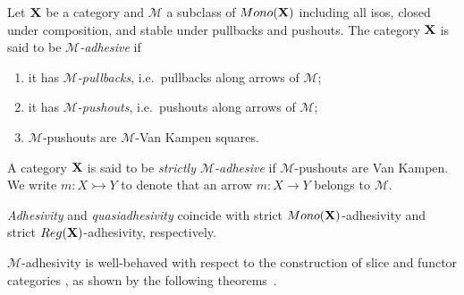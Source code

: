 \documentclass[a4paper,UKenglish,cleveref,pdftex,thm-restate,numberwithinsect]{lipics-v2021}
\def\X{\textbf {\textup{X}}}
\newcommand{\mon}{\mathsf{Mono}}
\newcommand{\reg}{\mathsf{Reg}}
\newcommand{\mto}{\rightarrowtail}
\begin{document}
\begin{definition}
	Let $\X$ be a category and $\mathcal{M}$ a subclass of
	$\mon(\X)$  including  all isos, closed under composition,  and stable under pullbacks and pushouts.  The category  $\X$ is said to be \emph{$\mathcal{M}$-adhesive} if
	\begin{enumerate}
		\item it has \emph{$\mathcal{M}$-pullbacks}, i.e.~pullbacks along arrows of $\mathcal{M}$;
		\item it has \emph{$\mathcal{M}$-pushouts}, i.e.~pushouts along arrows of $\mathcal{M}$;
		\item  $\mathcal{M}$-pushouts are $\mathcal{M}$-Van Kampen squares.
	\end{enumerate}
	A category $\X$ is said to be \emph{strictly $\mathcal{M}$-adhesive}
	if $\mathcal{M}$-pushouts are Van Kampen. We write $m\colon X \mto Y$ to denote that an arrow $m\colon X\to Y$ belongs to $\mathcal{M}$.
\end{definition}



\begin{remark}
	\label{rem:salva}
	\emph{Adhesivity} and \emph{quasiadhesivity} 
	\cite{lack2005adhesive,garner2012axioms} coincide with strict
	$\mon(\X) $-adhesivity and strict $\reg(\X)$-adhesivity,
	respectively.
\end{remark}


$\mathcal{M}$-adhesivity is well-behaved with respect to  the construction of slice and functor categories \cite{mac2013categories}, as shown by the following theorems~\cite{ehrig2006fundamentals,lack2005adhesive}.
\end{document}
